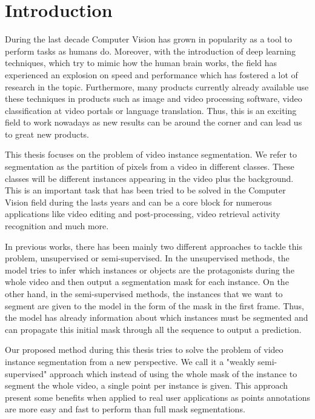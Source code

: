 
\chapter{Introduction}
\label{cha:introduction}

During the last decade Computer Vision has grown in popularity as a tool to perform tasks as humans do.
Moreover, with the introduction of deep learning techniques, which try to mimic how the human brain works, the field has experienced an explosion on speed and performance which has fostered a lot of research in the topic.
Furthermore, many products currently already available use these techniques in products such as image and video processing software, video classification at video portals or language translation.
Thus, this is an exciting field to work nowadays as new results can be around the corner and can lead us to great new products.


This thesis focuses on the problem of video instance segmentation.
We refer to segmentation as the partition of pixels from a video in different classes.
These classes will be different instances appearing in the video plus the background.
This is an important task that has been tried to be solved in the Computer Vision field during the lasts years and can be a core block for numerous applications like video editing and post-processing, video retrieval activity recognition and much more.

In previous works, there has been mainly two different approaches to tackle this problem, unsupervised or semi-supervised.
In the unsupervised methods, the model tries to infer which instances or objects are the protagonists during the whole video and then output a segmentation mask for each instance.
On the other hand, in the semi-supervised methods, the instances that we want to segment are given to the model in the form of the mask in the first frame.
Thus, the model has already information about which instances must be segmented and can propagate this initial mask through all the sequence to output a prediction.

Our proposed method during this thesis tries to solve the problem of video instance segmentation from a new perspective.
We call it a "weakly semi-supervised" approach which instead of using the whole mask of the instance to segment the whole video, a single point per instance is given.
This approach present some benefits when applied to real user applications as points annotations are more easy and fast to perform than full mask segmentations.

